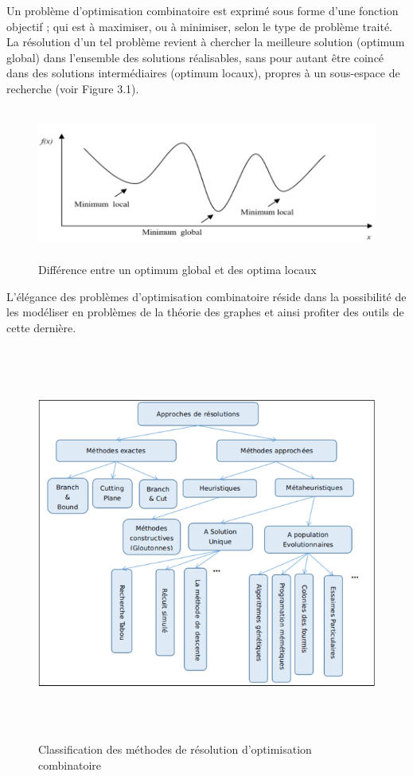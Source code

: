 Un problème d’optimisation combinatoire est exprimé sous forme d’une fonction objectif ; qui est à maximiser, ou à minimiser, selon le type de problème traité. La résolution d’un tel problème revient à chercher la meilleure solution (optimum global) dans l’ensemble des solutions réalisables, sans pour autant être coincé dans des solutions intermédiaires (optimum locaux), propres à un sous-espace de recherche (voir Figure 3.1).

\begin{figure}[H]
	\centering
	\includegraphics[width=15cm,height=5cm]{Chap3/1.png}
	\caption{Différence entre un optimum global et des optima locaux}
	\label{fig:CSF}
\end{figure}

L’élégance des problèmes d’optimisation combinatoire réside dans la possibilité de les modéliser en problèmes de la théorie des graphes et ainsi profiter des outils de cette dernière.

\begin{figure}[H]
	\centering
	\includegraphics[width=15cm,height=13cm]{Chap3/2.png}
	\caption{Classification des méthodes de résolution d’optimisation combinatoire}
	\label{fig:CSF}
\end{figure}

